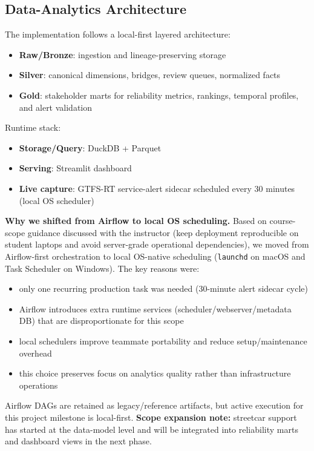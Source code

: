 \subsection{Data-Analytics Architecture}
The implementation follows a local-first layered architecture:
\begin{itemize}
    \item \textbf{Raw/Bronze}: ingestion and lineage-preserving storage
    \item \textbf{Silver}: canonical dimensions, bridges, review queues, normalized facts
    \item \textbf{Gold}: stakeholder marts for reliability metrics, rankings, temporal profiles, and alert validation
\end{itemize}

Runtime stack:
\begin{itemize}
    \item \textbf{Storage/Query}: DuckDB + Parquet
    \item \textbf{Serving}: Streamlit dashboard
    \item \textbf{Live capture}: GTFS-RT service-alert sidecar scheduled every 30 minutes (local OS scheduler)
\end{itemize}

\textbf{Why we shifted from Airflow to local OS scheduling.}
Based on course-scope guidance discussed with the instructor (keep deployment reproducible on student laptops and avoid server-grade operational dependencies), we moved from Airflow-first orchestration to local OS-native scheduling (\texttt{launchd} on macOS and Task Scheduler on Windows). The key reasons were:
\begin{itemize}
    \item only one recurring production task was needed (30-minute alert sidecar cycle)
    \item Airflow introduces extra runtime services (scheduler/webserver/metadata DB) that are disproportionate for this scope
    \item local schedulers improve teammate portability and reduce setup/maintenance overhead
    \item this choice preserves focus on analytics quality rather than infrastructure operations
\end{itemize}
Airflow DAGs are retained as legacy/reference artifacts, but active execution for this project milestone is local-first.
\textbf{Scope expansion note:} streetcar support has started at the data-model level and will be integrated into reliability marts and dashboard views in the next phase.

